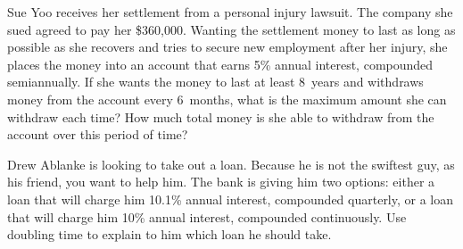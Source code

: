 \documentclass[12pt,letterpaper]{exam}
\begin{document}
\begin{questions}



\newpage
\question[10] Sue Yoo receives her settlement from a personal injury lawsuit. The company she sued agreed to pay her \$360,000. Wanting the settlement money to last as long as possible as she recovers and tries to secure new employment after her injury, she places the money into an account that earns 5\% annual interest, compounded semiannually. If she wants the money to last at least 8~years and withdraws money from the account every 6~months, what is the maximum amount she can withdraw each time? How much total money is she able to withdraw from the account over this period of time?



\newpage
\question[10] Drew Ablanke is looking to take out a loan. Because he is not the swiftest guy, as his friend, you want to help him. The bank is giving him two options: either a loan that will charge him 10.1\% annual interest, compounded quarterly, or a loan that will charge him 10\% annual interest, compounded continuously. Use doubling time to explain to him which loan he should take. \pvspace{1cm}


\end{questions}
\end{document}
